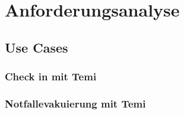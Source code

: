 \chapter{Anforderungsanalyse}
\section{Use Cases}
\subsection{Check in mit Temi}
\subsection{Notfallevakuierung mit Temi}
